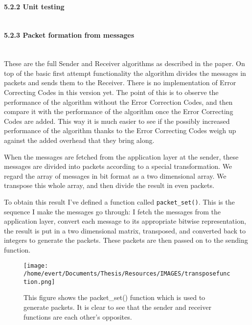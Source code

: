 \paragraph{5.2.2 Unit testing\\\\}\label{unit-testing}

\paragraph{5.2.3 Packet formation from
messages\\\\}\label{packet-formation-from-messages}

These are the full Sender and Receiver algorithms as described in the
paper. On top of the basic first attempt functionality the algorithm
divides the messages in packets and sends them to the Receiver. There is
no implementation of Error Correcting Codes in this version yet. The
point of this is to observe the performance of the algorithm without the
Error Correction Codes, and then compare it with the performance of the
algorithm once the Error Correcting Codes are added. This way it is much
easier to see if the possibly increased performance of the algorithm
thanks to the Error Correcting Codes weigh up against the added overhead
that they bring along.

When the messages are fetched from the application layer at the sender,
these messages are divided into packets according to a special
transformation. We regard the array of messages in bit format as a two
dimensional array. We transpose this whole array, and then divide the
result in even packets.

To obtain this result I've defined a function called
\texttt{packet\_set()}. This is the sequence I make the messages go
through: I fetch the messages from the application layer, convert each
message to its appropriate bitwise representation, the result is put in
a two dimensional matrix, transposed, and converted back to integers to
generate the packets. These packets are then passed on to the sending
function.

\begin{figure}[htbp]
\centering
\texttt{[image: /home/evert/Documents/Thesis/Resources/IMAGES/transposefunction.png]}
\caption{This figure shows the packet\_set() function which is used to
generate packets. It is clear to see that the sender and receiver
functions are each other's opposites.}
\end{figure}

